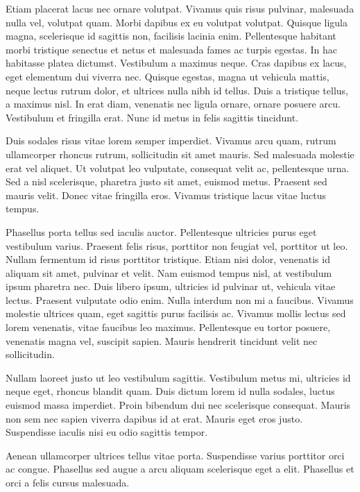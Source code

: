 Etiam placerat lacus nec ornare volutpat. Vivamus quis risus pulvinar, malesuada nulla vel, volutpat quam. Morbi dapibus ex eu volutpat volutpat. Quisque ligula magna, scelerisque id sagittis non, facilisis lacinia enim. Pellentesque habitant morbi tristique senectus et netus et malesuada fames ac turpis egestas. In hac habitasse platea dictumst. Vestibulum a maximus neque. Cras dapibus ex lacus, eget elementum dui viverra nec. Quisque egestas, magna ut vehicula mattis, neque lectus rutrum dolor, et ultrices nulla nibh id tellus. Duis a tristique tellus, a maximus nisl. In erat diam, venenatis nec ligula ornare, ornare posuere arcu. Vestibulum et fringilla erat. Nunc id metus in felis sagittis tincidunt.

Duis sodales risus vitae lorem semper imperdiet. Vivamus arcu quam, rutrum ullamcorper rhoncus rutrum, sollicitudin sit amet mauris. Sed malesuada molestie erat vel aliquet. Ut volutpat leo vulputate, consequat velit ac, pellentesque urna. Sed a nisl scelerisque, pharetra justo sit amet, euismod metus. Praesent sed mauris velit. Donec vitae fringilla eros. Vivamus tristique lacus vitae luctus tempus.

Phasellus porta tellus sed iaculis auctor. Pellentesque ultricies purus eget vestibulum varius. Praesent felis risus, porttitor non feugiat vel, porttitor ut leo. Nullam fermentum id risus porttitor tristique. Etiam nisi dolor, venenatis id aliquam sit amet, pulvinar et velit. Nam euismod tempus nisl, at vestibulum ipsum pharetra nec. Duis libero ipsum, ultricies id pulvinar ut, vehicula vitae lectus. Praesent vulputate odio enim. Nulla interdum non mi a faucibus. Vivamus molestie ultrices quam, eget sagittis purus facilisis ac. Vivamus mollis lectus sed lorem venenatis, vitae faucibus leo maximus. Pellentesque eu tortor posuere, venenatis magna vel, suscipit sapien. Mauris hendrerit tincidunt velit nec sollicitudin.

Nullam laoreet justo ut leo vestibulum sagittis. Vestibulum metus mi, ultricies id neque eget, rhoncus blandit quam. Duis dictum lorem id nulla sodales, luctus euismod massa imperdiet. Proin bibendum dui nec scelerisque consequat. Mauris non sem nec sapien viverra dapibus id at erat. Mauris eget eros justo. Suspendisse iaculis nisi eu odio sagittis tempor.

Aenean ullamcorper ultrices tellus vitae porta. Suspendisse varius porttitor orci ac congue. Phasellus sed augue a arcu aliquam scelerisque eget a elit. Phasellus et orci a felis cursus malesuada. 
